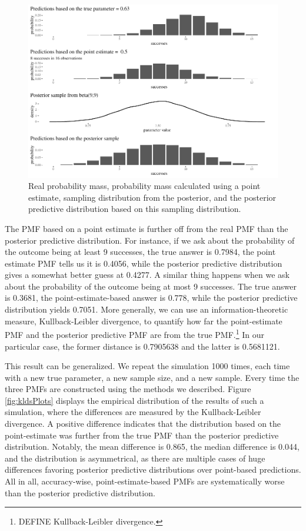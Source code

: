\documentclass[
  10pt,
  dvipsnames,enabledeprecatedfontcommands]{scrartcl}
\begin{document}
\begin{figure}[H]

\begin{center}\includegraphics[width=0.8\linewidth]{paper-outline_files/figure-latex/fig:posteriorPrediction2-1} \end{center}


\caption{Real probability mass, probability mass calculated using a point estimate, sampling distribution from the posterior, and the posterior predictive distribution based on this sampling distribution.}
\label{fig:posteriorPrediction}
\end{figure}

The PMF based on a point estimate is further off from the real PMF than
the posterior predictive distribution. For instance, if we ask about the
probability of the outcome being at least 9 successes, the true answer
is 0.7984, the point estimate PMF tells us it is 0.4056, while the
posterior predictive distribution gives a somewhat better guess at
0.4277. A similar thing happens when we ask about the probability of the
outcome being at most 9 successes. The true answer is 0.3681, the
point-estimate-based answer is 0.778, while the posterior predictive
distribution yields 0.7051. More generally, we can use an
information-theoretic measure, Kullback-Leibler divergence, to quantify
how far the point-estimate PMF and the posterior predictive PMF are from
the true PMF.\footnote{DEFINE Kullback-Leibler divergence.} In our
particular case, the former distance is 0.7905638 and the latter is
0.5681121.

This result can be generalized. We repeat the simulation 1000 times,
each time with a new true parameter, a new sample size, and a new
sample. Every time the three PMFs are constructed using the methods we
described. Figure \ref{fig:kldsPlots} displays the empirical
distribution of the results of such a simulation, where the differences
are measured by the Kullback-Leibler divergence. A positive difference
indicates that the distribution based on the point-estimate was further
from the true PMF than the posterior predictive distribution. Notably,
the mean difference is 0.865, the median difference is 0.044, and the
distribution is asymmetrical, as there are multiple cases of huge
differences favoring posterior predictive distributions over point-based
predictions. All in all, accuracy-wise, point-estimate-based PMFs are
systematically worse than the posterior predictive distribution.
\end{document}
